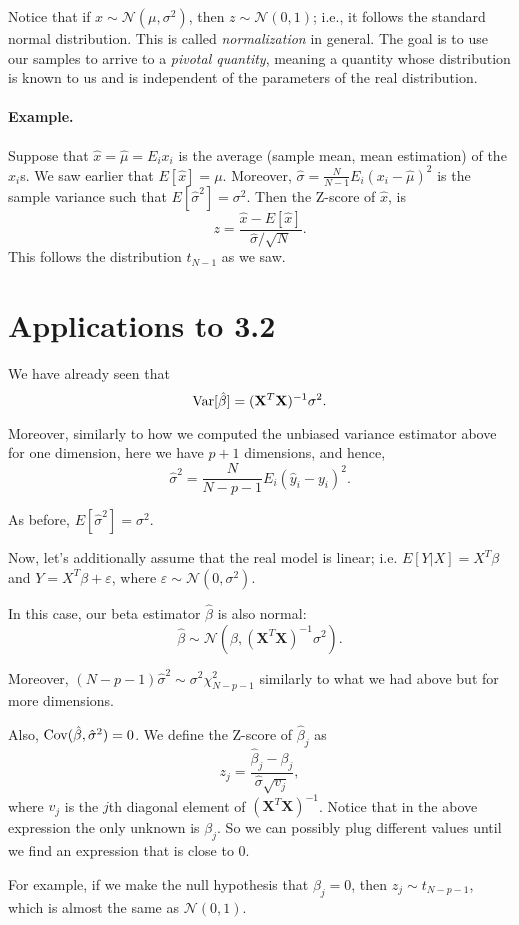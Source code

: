 \documentclass[11pt]{article}
\theoremstyle{definition}
\newcommand{\XX}{\mathbf{X}}
\newcommand{\Normal}[2]{\ensuremath{\mathcal N (#1, #2)}}
\begin{document}
Notice that if $x\sim\Normal{\mu}{\sigma^2}$, then $z\sim\Normal 0 1$; i.e., it
follows the standard normal distribution. This is called \emph{normalization} in
general. The goal is to use our samples to arrive to a \emph{pivotal quantity},
meaning a quantity whose distribution is known to us and is independent of the
parameters of the real distribution.

\paragraph{Example.} Suppose that $\hat x=\hat\mu=E_i x_i$ is the average (sample mean,
mean estimation) of the $x_i$s. We saw earlier that $E[\hat{x}]=\mu$. Moreover,
$\hat\sigma=\frac{N}{N-1}E_i(x_i-\hat\mu)^2$ is the sample variance such that
$E[\hat\sigma^2]=\sigma^2$. Then the Z-score of $\hat x$, is
\[z=\frac{\hat x-E[\hat x]}{\hat\sigma/\sqrt{N}}.\]
This follows the distribution $t_{N-1}$ as we saw.

\section{Applications to 3.2}
We have already seen that
\[\Var[\hat\beta]=(\XX^T\XX)^{-1}\sigma^2.\]

Moreover, similarly to how we computed the unbiased variance estimator above for
one dimension, here we have $p+1$ dimensions, and hence,
\[\hat\sigma^2=\frac{N}{N-p-1}E_i(\hat y_i-y_i)^2.\]

As before, $E[\hat\sigma^2]=\sigma^2$.

Now, let's additionally assume that the real model is linear; i.e.
$E[Y|X]=X^T\beta$ and $Y=X^T\beta+\varepsilon$, where
$\varepsilon\sim\Normal{0}{\sigma^2}$.

In this case, our beta estimator $\hat\beta$ is also normal:
\[\hat\beta\sim\Normal{\beta}{(\XX^T\XX)^{-1}\sigma^2}.\]

Moreover, $(N-p-1)\hat\sigma^2\sim\sigma^2\chi^2_{N-p-1}$ similarly to what we
had above but for more dimensions.

Also, $\operatorname*{Cov}(\hat\beta,\hat\sigma^2)=0$. We define the Z-score of $\hat\beta_j$
as
\[z_j=\frac{\hat\beta_j-\beta_j}{\hat\sigma\sqrt{v_j}},\] where $v_j$ is the
$j$th diagonal element of $(\XX^T\XX)^{-1}$. Notice that in the above expression
the only unknown is $\beta_j$. So we can possibly plug different values until we
find an expression that is close to 0.

For example, if we make the null hypothesis that $\beta_j=0$, then $z_j\sim
	t_{N-p-1}$, which is almost the same as $\Normal 0 1$.
\end{document}

